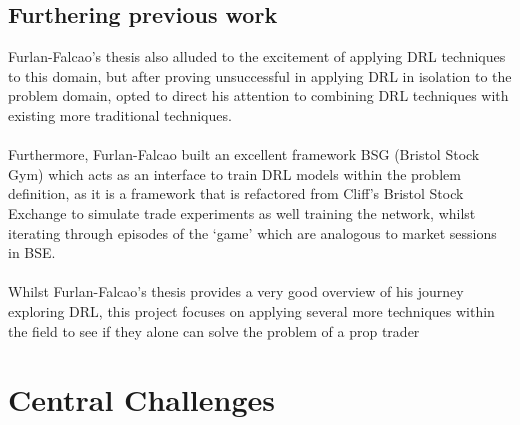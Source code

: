 \documentclass[ %
                    author={Ashwinder Khurana},
                supervisor={Prof Dave Cliff},
                    degree={MEng},
                     title={The Deeply Reinforced Trader},
                  subtitle={},
                      type={enterprise},
                      year={2020} ]{dissertation}
\begin{document}
\vspace{0.5cm}
\subsection{Furthering previous work}
\label{subsection:Furthering previous work}
\vspace{0.5cm}
Furlan-Falcao's thesis \cite{falcao} also alluded to the excitement of applying DRL techniques to this domain, but after proving unsuccessful in applying DRL in isolation to the problem domain, opted to direct his attention to combining DRL techniques with existing more traditional techniques. 
\\
\\
Furthermore, Furlan-Falcao built an excellent framework BSG (Bristol Stock Gym) which acts as an interface to train DRL models within the problem definition, as it is a framework that is refactored from Cliff's Bristol Stock Exchange to simulate trade experiments as well training the network, whilst iterating through episodes of the \enquote*{game} which are analogous to market sessions in BSE.
\\
\\
Whilst Furlan-Falcao's thesis provides a very good overview of his journey exploring DRL, this project focuses on applying several more techniques within the field to see if they alone can solve the problem of a prop trader

\vspace{0.5cm}
\section{Central Challenges}
\label{section:Central Challenges}
\vspace{0.5cm} 
\end{document}
